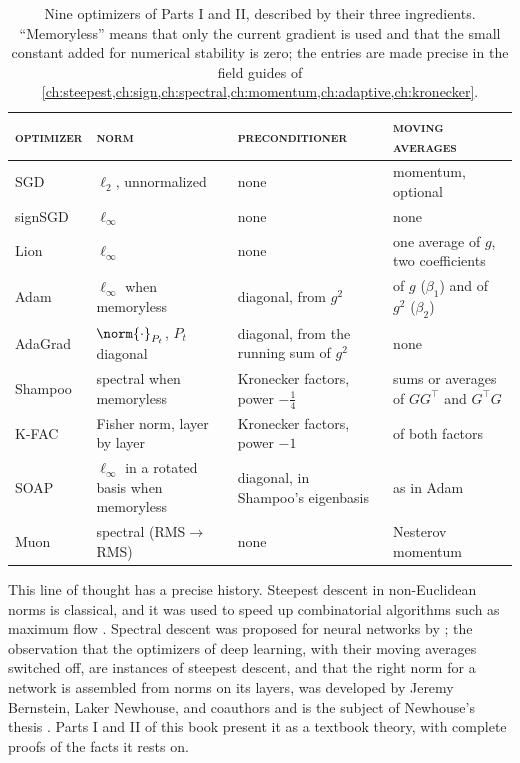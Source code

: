 \begin{refsection}
\begin{table}[t]
\centering\small
\renewcommand{\arraystretch}{1.15}
\begin{tabular}{@{}>{\raggedright\arraybackslash}p{19mm}>{\raggedright\arraybackslash}p{29mm}>{\raggedright\arraybackslash}p{30mm}>{\raggedright\arraybackslash}p{29mm}@{}}
\toprule
\textsc{optimizer} & \textsc{norm} & \textsc{preconditioner} & \textsc{moving averages}\\
\midrule
SGD & $\ell_2$, unnormalized & none & momentum, optional\\
signSGD & $\ell_\infty$ & none & none\\
Lion & $\ell_\infty$ & none & one average of $g$, two coefficients\\
Adam & $\ell_\infty$ when memoryless & diagonal, from $g^2$ & of $g$ ($\beta_1$) and of $g^2$ ($\beta_2$)\\
AdaGrad & $\norm{\cdot}_{P_t}$, $P_t$ diagonal & diagonal, from the running sum of $g^2$ & none\\
Shampoo & spectral when memoryless & Kronecker factors, power $-\frac14$ & sums or averages of $GG^\top$ and $G^\top G$\\
K-FAC & Fisher norm, layer by layer & Kronecker factors, power $-1$ & of both factors\\
SOAP & $\ell_\infty$ in a rotated basis when memoryless & diagonal, in Shampoo's eigenbasis & as in Adam\\
Muon & spectral (RMS$\to$RMS) & none & Nesterov momentum\\
\bottomrule
\end{tabular}
\caption{Nine optimizers of Parts I and II, described by their three ingredients. ``Memoryless'' means that only the current gradient is used and that the small constant added for numerical stability is zero; the entries are made precise in the field guides of \cref{ch:steepest,ch:sign,ch:spectral,ch:momentum,ch:adaptive,ch:kronecker}.}
\label{tab:prologue:ingredients}
\end{table}

This line of thought has a precise history. Steepest descent in non-Euclidean norms is classical, and it was used to speed up combinatorial algorithms such as maximum flow \parencite{KelnerEtAl2014}. Spectral descent was proposed for neural networks by \textcite{CarlsonEtAl2015}; the observation that the optimizers of deep learning, with their moving averages switched off, are instances of steepest descent, and that the right norm for a network is assembled from norms on its layers, was developed by Jeremy Bernstein, Laker Newhouse, and coauthors \parencite{BernsteinNewhouse2024,LargeEtAl2024,BernsteinNewhouse2025} and is the subject of Newhouse's thesis \parencite{Newhouse2025}. Parts I and II of this book present it as a textbook theory, with complete proofs of the facts it rests on.


\end{refsection}
